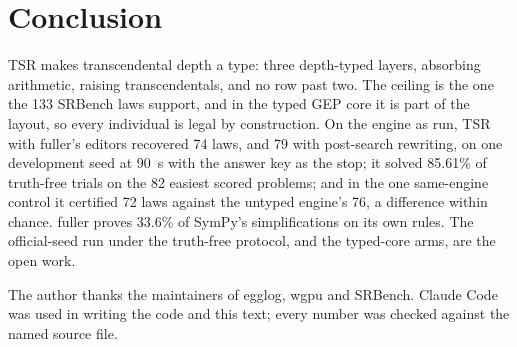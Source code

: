 \documentclass[sigconf,nonacm]{acmart}
\begin{document}
\section{Conclusion}
\label{sec:conclusion}

TSR makes transcendental depth a type: three depth-typed layers, absorbing
arithmetic, raising transcendentals, and no row past two. The ceiling is the
one the 133 SRBench laws support, and in the typed GEP core it is part of the
layout, so every individual is legal by construction. On the engine as run, TSR
with fuller's editors recovered 74 laws, and 79 with post-search rewriting, on
one development seed at 90~s with the answer key as the stop; it solved
85.61\% of truth-free trials on the 82 easiest scored problems; and in the one
same-engine control it certified 72 laws against the untyped engine's 76, a
difference within chance. fuller proves 33.6\% of SymPy's simplifications on
its own rules. The official-seed run under the truth-free protocol, and the
typed-core arms, are the open work.

\begin{acks}
The author thanks the maintainers of egglog, wgpu and SRBench. Claude Code was
used in writing the code and this text; every number was checked against the
named source file.
\end{acks}



\end{document}
